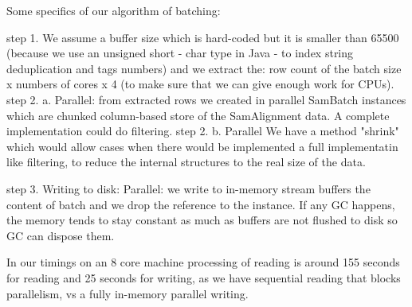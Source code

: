 Some specifics of our algorithm of batching:

step 1. We assume a buffer size which is hard-coded but it is smaller than 65500 (because we use an unsigned short - char type in Java - to index string deduplication and tags numbers) and we extract the: row count of the batch size x numbers of cores x 4 (to make sure that we can give enough work for CPUs). 
step 2. a. Parallel: from extracted rows we created in parallel SamBatch instances which are chunked column-based store of the SamAlignment data. A complete implementation could do filtering.
step 2. b. Parallel We have a method "shrink" which would allow cases when there would be implemented a full implementatin like filtering, to reduce the internal structures to the real size of the data.

step 3. Writing to disk: Parallel: we write to in-memory stream buffers the content of batch and we drop the reference to the instance. If any GC happens, the memory tends to stay constant as much as buffers are not flushed to disk so GC can dispose them.

In our timings on an 8 core machine processing of reading is around 155 seconds for reading and 25 seconds for writing, as we have sequential reading that blocks parallelism, vs a fully in-memory parallel writing.